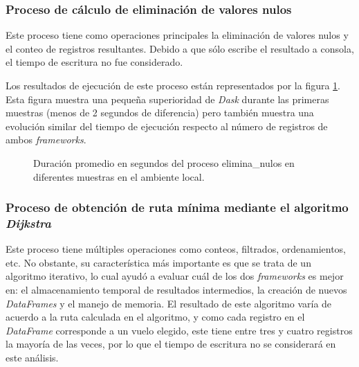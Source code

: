 \subsubsection{Proceso de cálculo de eliminación de valores nulos}

Este proceso tiene como operaciones principales la eliminación de valores nulos y el conteo de registros resultantes. Debido a que sólo escribe el resultado a consola, el tiempo de escritura no fue considerado.

Los resultados de ejecución de este proceso están representados por la figura \ref{lineas:local-elimina-nulos}. Esta figura muestra una pequeña superioridad de \textit{Dask} durante las primeras muestras (menos de 2 segundos de diferencia) pero también muestra una evolución similar del tiempo de ejecución respecto al número de registros de ambos \textit{frameworks}. 

\begin{figure}
\centering
{}
\caption{Duración promedio en segundos del proceso elimina\_nulos en diferentes muestras en el ambiente local.}
\label{lineas:local-elimina-nulos}
\end{figure}

\subsubsection{Proceso de obtención de ruta mínima mediante el algoritmo \textit{Dijkstra}}

Este proceso tiene múltiples operaciones como conteos, filtrados, ordenamientos, etc. No obstante, su característica más importante es que se trata de un algoritmo iterativo, lo cual ayudó a evaluar cuál de los dos \textit{frameworks} es mejor en: el almacenamiento temporal de resultados intermedios, la creación de nuevos \textit{DataFrames} y el manejo de memoria. El resultado de este algoritmo varía de acuerdo a la ruta calculada en el algoritmo, y como cada registro en el \textit{DataFrame} corresponde a un vuelo elegido, este tiene entre tres y cuatro registros la mayoría de las veces, por lo que el tiempo de escritura no se considerará en este análisis.

